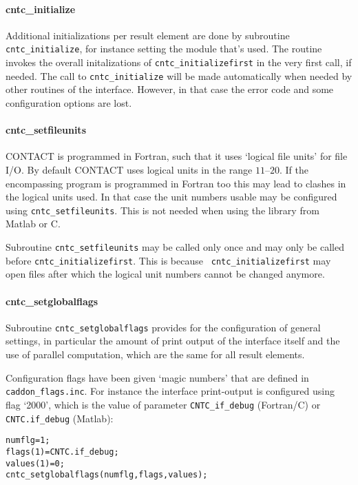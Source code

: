 \documentclass[12pt]{report}
\begin{document}
\paragraph{cntc\_initialize}

Additional initializations per result element are done by subroutine {\tt
cntc\_\-init\-ial\-ize}, for instance setting the module that's used. The
routine invokes the overall initalizations of {\tt cntc\_initializefirst}
in the very first call, if needed. The call to {\tt cntc\_initialize} will
be made automatically when needed by other routines of the interface.
However, in that case the error code and some configuration options are
lost.

\paragraph{cntc\_setfileunits}

CONTACT is programmed in Fortran, such that it uses `logical file units'
for file I/O. By default CONTACT uses logical units in the range
$11\text{--}20$. If the encompassing program is programmed in Fortran too
this may lead to clashes in the logical units used. In that case the unit
numbers usable may be configured using {\tt cntc\_setfileunits}. This is
not needed when using the library from Matlab or C.

Subroutine {\tt cntc\_setfileunits} may be called only once and may only be
called before {\tt cntc\_\-init\-ia\-lize\-first}. This is because {\tt
cntc\_initializefirst} may open files after which the logical unit numbers
cannot be changed anymore.

\paragraph{cntc\_setglobalflags}

Subroutine {\tt cntc\_setglobalflags} provides for the configuration of
general settings, in particular the amount of print output of the
interface itself and the use of parallel computation, which are the same
for all result elements.

Configuration flags have been given `magic numbers' that are defined in {\tt 
caddon\_flags.inc}. For instance the interface
print-output is configured using flag `2000', which is the value of
parameter {\tt CNTC\_if\_debug} (Fortran/C) or {\tt CNTC.if\_debug} (Matlab):
\begin{alltt}\small
    numflg    = 1;             % configure idebug = 0 in the CONTACT library
    flags(1)  = CNTC.if_debug;
    values(1) = 0;
    cntc_setglobalflags(numflg, flags, values);
\end{alltt}
\end{document}
